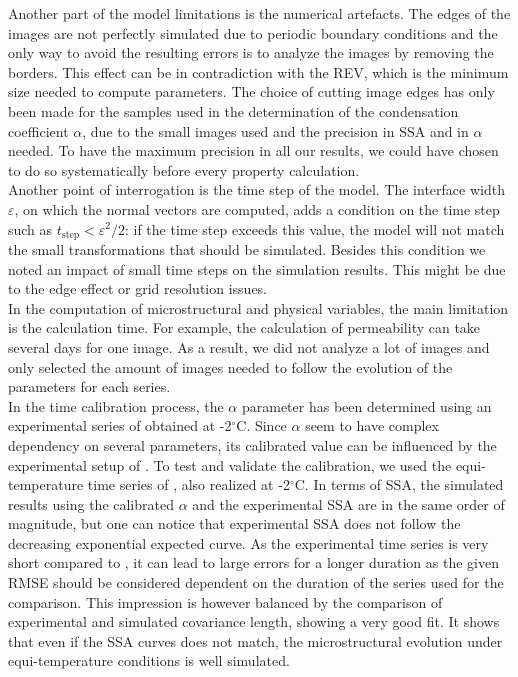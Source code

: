 \documentclass[draft,ms]{agujournal2019}
\begin{document}
Another part of the model limitations is the numerical artefacts. The edges of the images are not perfectly simulated due to periodic boundary conditions and the only way to avoid the resulting errors is to analyze the images by removing the borders. This effect can be in contradiction with the REV, which is the minimum size needed to compute parameters. The choice of cutting image edges has only been made for the samples used in the determination of the condensation coefficient $\alpha$, due to the small images used and the precision in SSA and in $\alpha$ needed. To have the maximum precision in all our results, we could have chosen to do so systematically before every property calculation.\\

Another point of interrogation is the time step of the model. The interface width $\varepsilon$, on which the normal vectors are computed, adds a condition on the time step such as $t_{\mathrm{step}} < \varepsilon^2/2$: if the time step exceeds this value, the model will not match the small transformations that should be simulated. Besides this condition we noted an impact of small time steps on the simulation results. This might be due to the edge effect or grid resolution issues.\\

In the computation of microstructural and physical variables, the main limitation is the calculation time. For example, the calculation of permeability can take several days for one image. As a result, we did not analyze a lot of images and only selected the amount of images needed to follow the evolution of the parameters for each series.\\

In the time calibration process, the $\alpha$ parameter has been determined using an experimental series of  obtained at -2$^\circ$C. Since $\alpha$ seem to have complex dependency on several parameters, its calibrated value can be influenced by the experimental setup of . To test and validate the calibration, we used the equi-temperature time series of , also realized at -2$^\circ$C. In terms of SSA, the simulated results using the calibrated $\alpha$ and the experimental SSA are in the same order of magnitude, but one can notice that  experimental SSA does not follow the decreasing exponential expected curve. As the experimental time series is very short compared to , it can lead to large errors for a longer duration as the given RMSE should be considered dependent on the duration of the series used for the comparison. This impression is however balanced by the comparison of experimental and simulated covariance length, showing a very good fit. It shows that even if the SSA curves does not match, the microstructural evolution under equi-temperature conditions is well simulated.
\end{document}
